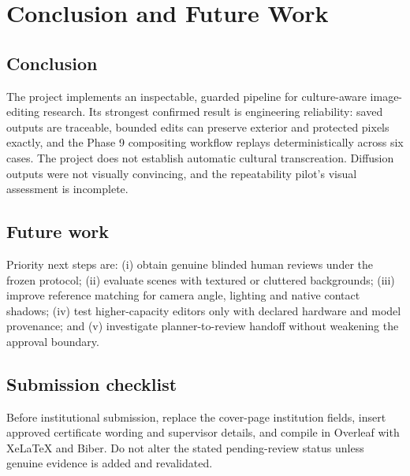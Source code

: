 \chapter{Conclusion and Future Work}
\label{ch:conclusion}
\section{Conclusion}
The project implements an inspectable, guarded pipeline for culture-aware image-editing research. Its strongest confirmed result is engineering reliability: saved outputs are traceable, bounded edits can preserve exterior and protected pixels exactly, and the Phase 9 compositing workflow replays deterministically across six cases. The project does not establish automatic cultural transcreation. Diffusion outputs were not visually convincing, and the repeatability pilot's visual assessment is incomplete.

\section{Future work}
Priority next steps are: (i) obtain genuine blinded human reviews under the frozen protocol; (ii) evaluate scenes with textured or cluttered backgrounds; (iii) improve reference matching for camera angle, lighting and native contact shadows; (iv) test higher-capacity editors only with declared hardware and model provenance; and (v) investigate planner-to-review handoff without weakening the approval boundary.

\section{Submission checklist}
Before institutional submission, replace the cover-page institution fields, insert approved certificate wording and supervisor details, and compile in Overleaf with XeLaTeX and Biber. Do not alter the stated pending-review status unless genuine evidence is added and revalidated.
